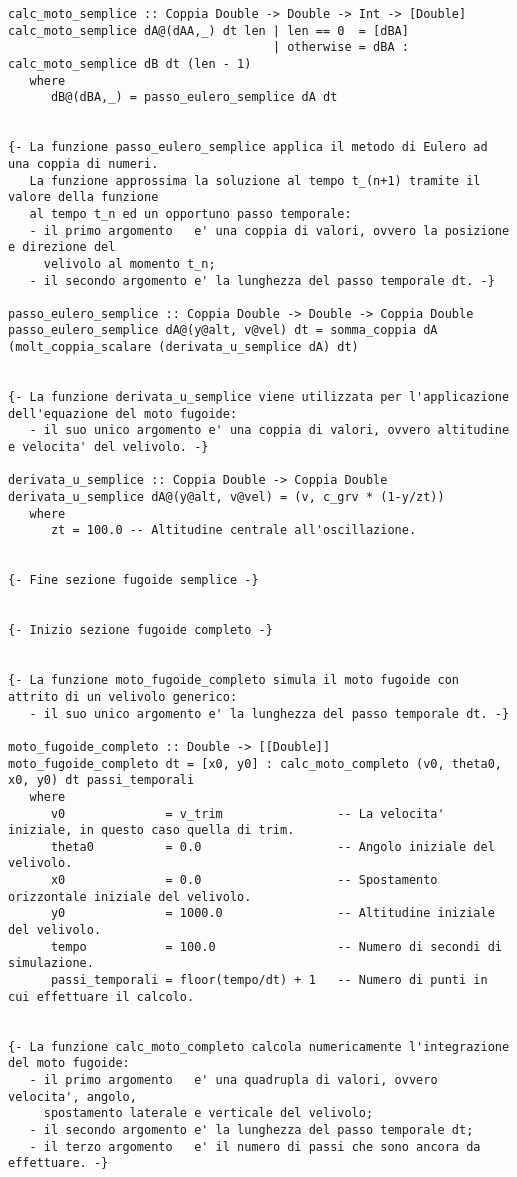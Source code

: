 \begin{verbatim}
calc_moto_semplice :: Coppia Double -> Double -> Int -> [Double]
calc_moto_semplice dA@(dAA,_) dt len | len == 0  = [dBA]
                                     | otherwise = dBA : calc_moto_semplice dB dt (len - 1)
   where
      dB@(dBA,_) = passo_eulero_semplice dA dt


{- La funzione passo_eulero_semplice applica il metodo di Eulero ad una coppia di numeri.
   La funzione approssima la soluzione al tempo t_(n+1) tramite il valore della funzione 
   al tempo t_n ed un opportuno passo temporale:
   - il primo argomento   e' una coppia di valori, ovvero la posizione e direzione del 
     velivolo al momento t_n;
   - il secondo argomento e' la lunghezza del passo temporale dt. -}

passo_eulero_semplice :: Coppia Double -> Double -> Coppia Double
passo_eulero_semplice dA@(y@alt, v@vel) dt = somma_coppia dA (molt_coppia_scalare (derivata_u_semplice dA) dt)


{- La funzione derivata_u_semplice viene utilizzata per l'applicazione dell'equazione del moto fugoide:
   - il suo unico argomento e' una coppia di valori, ovvero altitudine e velocita' del velivolo. -}

derivata_u_semplice :: Coppia Double -> Coppia Double
derivata_u_semplice dA@(y@alt, v@vel) = (v, c_grv * (1-y/zt))
   where
      zt = 100.0 -- Altitudine centrale all'oscillazione.


{- Fine sezione fugoide semplice -}


{- Inizio sezione fugoide completo -}


{- La funzione moto_fugoide_completo simula il moto fugoide con attrito di un velivolo generico:
   - il suo unico argomento e' la lunghezza del passo temporale dt. -}

moto_fugoide_completo :: Double -> [[Double]]
moto_fugoide_completo dt = [x0, y0] : calc_moto_completo (v0, theta0, x0, y0) dt passi_temporali
   where
      v0              = v_trim                -- La velocita' iniziale, in questo caso quella di trim.
      theta0          = 0.0                   -- Angolo iniziale del velivolo.
      x0              = 0.0                   -- Spostamento orizzontale iniziale del velivolo.
      y0              = 1000.0                -- Altitudine iniziale del velivolo.
      tempo           = 100.0                 -- Numero di secondi di simulazione.
      passi_temporali = floor(tempo/dt) + 1   -- Numero di punti in cui effettuare il calcolo.


{- La funzione calc_moto_completo calcola numericamente l'integrazione del moto fugoide:
   - il primo argomento   e' una quadrupla di valori, ovvero velocita', angolo,
     spostamento laterale e verticale del velivolo; 
   - il secondo argomento e' la lunghezza del passo temporale dt;
   - il terzo argomento   e' il numero di passi che sono ancora da effettuare. -}


\end{verbatim}
